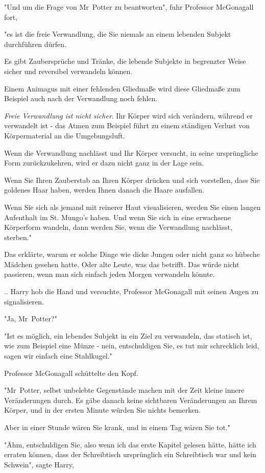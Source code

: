 {"Und um die Frage von Mr~Potter zu beantworten", fuhr Professor McGonagall fort,

"es ist die freie Verwandlung, die Sie niemals an einem lebenden Subjekt durchführen dürfen.

Es gibt Zaubersprüche und Tränke, die lebende Subjekte in begrenzter Weise sicher und reversibel verwandeln können.

Einem Animagus mit einer fehlenden Gliedmaße wird diese Gliedmaße zum Beispiel auch nach der Verwandlung noch fehlen.

\emph{Freie Verwandlung ist nicht sicher}. Ihr Körper wird sich verändern, während er verwandelt ist - das Atmen zum Beispiel führt zu einem ständigen Verlust von Körpermaterial an die Umgebungsluft.

Wenn die Verwandlung nachlässt und Ihr Körper versucht, in seine ursprüngliche Form zurückzukehren, wird er dazu nicht ganz in der Lage sein.

Wenn Sie Ihren Zauberstab an Ihren Körper drücken und sich vorstellen, dass Sie goldenes Haar haben, werden Ihnen danach die Haare ausfallen.

Wenn Sie sich als jemand mit reinerer Haut visualisieren, werden Sie einen langen Aufenthalt im St. Mungo's haben. Und wenn Sie sich in eine erwachsene Körperform wandeln, dann werden Sie, wenn die Verwandlung nachlässt, sterben."

Das erklärte, warum er solche Dinge wie dicke Jungen oder nicht ganz so hübsche Mädchen gesehen hatte. Oder alte Leute, was das betrifft. Das würde nicht passieren, wenn man sich einfach jeden Morgen verwandeln könnte.

.. Harry hob die Hand und versuchte, Professor McGonagall mit seinen Augen zu signalisieren.

"Ja, Mr~Potter?"

"Ist es möglich, ein lebendes Subjekt in ein Ziel zu verwandeln, das statisch ist, wie zum Beispiel eine Münze - nein, entschuldigen Sie, es tut mir schrecklich leid, sagen wir einfach eine Stahlkugel."

Professor McGonagall schüttelte den Kopf.

"Mr~Potter, selbst unbelebte Gegenstände machen mit der Zeit kleine innere Veränderungen durch. Es gäbe danach keine sichtbaren Veränderungen an Ihrem Körper, und in der ersten Minute würden Sie nichts bemerken.

Aber in einer Stunde wären Sie krank, und in einem Tag wären Sie tot."

"Ähm, entschuldigen Sie, also wenn ich das erste Kapitel gelesen hätte, hätte ich erraten können, dass der Schreibtisch ursprünglich ein Schreibtisch war und kein Schwein", sagte Harry,

}
